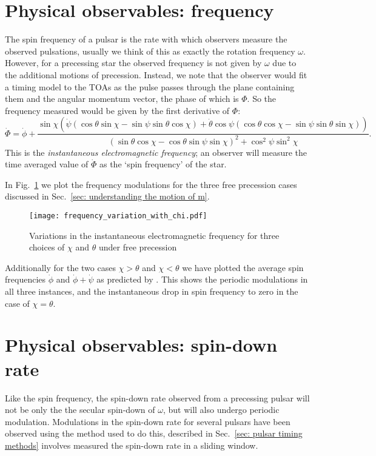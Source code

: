 \documentclass[../full_thesis/full_thesis.tex]{subfiles}
\begin{document}
\section{Physical observables: frequency}

The spin frequency of a pulsar is the rate with which observers measure the
observed pulsations, usually we think of this as exactly the rotation frequency
$\omega$. However, for a precessing star the observed frequency is not given by
$\omega$ due to the additional motions of precession. Instead, we note that the
observer would fit a timing model to the TOAs as the pulse passes through the
plane containing them and the angular momentum vector, the phase of which is
$\Phi$. So the frequency measured would be given by the first derivative of $\Phi$:
\begin{equation}
\dot{\Phi} = \dot{\phi}
+ \frac{\sin\chi \left(
\dot{\psi} (\cos\theta\sin\chi - \sin \psi \sin \theta \cos\chi) +
\dot{\theta} \cos\psi (\cos\theta\cos\chi - \sin \psi \sin \theta \sin\chi)\right)
}{(\sin\theta \cos \chi - \cos \theta \sin \psi \sin \chi)^{2} + \cos^{2}\psi \sin^{2} \chi}.
\label{eqn: Phi_dot}
\end{equation}
This is the \emph{instantaneous electromagnetic frequency}; an observer
will measure the time averaged value of $\dot{\Phi}$ as the `spin frequency' of
the star.

In Fig.~\ref{fig: frequency variations} we plot the frequency modulations for the
three free precession cases discussed in Sec.~\ref{sec: understanding the motion of m}.
\begin{figure}[ht]
\centering
  \texttt{[image: frequency\_variation\_with\_chi.pdf]}
\caption{Variations in the instantaneous electromagnetic frequency for three choices
of $\chi$ and $\theta$ under free precession}
\label{fig: frequency variations}
\end{figure}
Additionally for the two cases $\chi>\theta$ and $\chi < \theta$ we have
plotted the average spin frequencies $\dot{\phi}$ and $\dot{\phi}+\dot{\psi}$
as predicted by \citet{Jones2001}. This shows the periodic modulations in all
three instances, and the instantaneous drop in spin frequency to zero in the
case of $\chi=\theta$.


\section{Physical observables: spin-down rate}

Like the spin frequency, the spin-down rate observed from a precessing pulsar
will not be only the the secular spin-down of $\omega$, but will also undergo
periodic modulation. Modulations in the spin-down rate for several pulsars have
been observed \citep{Lyne2010, Perera2015} using the method used to do this,
described in Sec.~\ref{sec: pulsar timing methods} involves measured the
spin-down rate in a sliding window.
\end{document}
